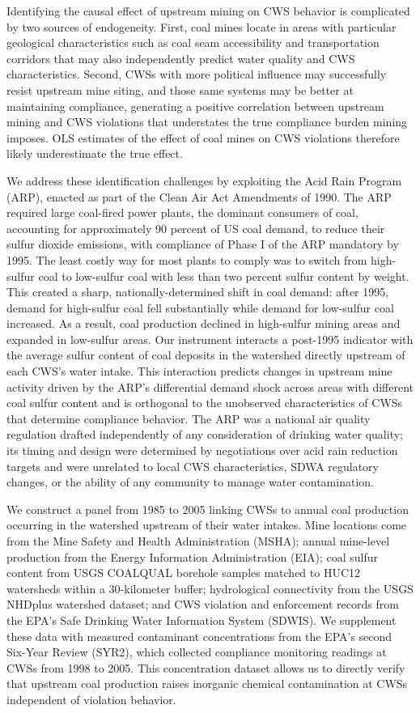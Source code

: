 \documentclass{article}
\begin{document}
Identifying the causal effect of upstream mining on CWS behavior is complicated by two sources of endogeneity. First, coal mines locate in areas with particular geological characteristics such as coal seam accessibility and transportation corridors that may also independently predict water quality and CWS characteristics. Second, CWSs with more political influence may successfully resist upstream mine siting, and those same systems may be better at maintaining compliance, generating a positive correlation between upstream mining and CWS violations that understates the true compliance burden mining imposes. OLS estimates of the effect of coal mines on CWS violations therefore likely underestimate the true effect.

We address these identification challenges by exploiting the Acid Rain Program (ARP), enacted as part of the Clean Air Act Amendments of 1990. The ARP required large coal-fired power plants, the dominant consumers of coal, accounting for approximately 90 percent of US coal demand, to reduce their sulfur dioxide emissions, with compliance of Phase I of the ARP mandatory by 1995. The least costly way for most plants to comply was to switch from high-sulfur coal to low-sulfur coal with less than two percent sulfur content by weight. This created a sharp, nationally-determined shift in coal demand: after 1995, demand for high-sulfur coal fell substantially while demand for low-sulfur coal increased. As a result, coal production declined in high-sulfur mining areas and expanded in low-sulfur areas. Our instrument interacts a post-1995 indicator with the average sulfur content of coal deposits in the watershed directly upstream of each CWS's water intake. This interaction predicts changes in upstream mine activity driven by the ARP's differential demand shock across areas with different coal sulfur content and is orthogonal to the unobserved characteristics of CWSs that determine compliance behavior. The ARP was a national air quality regulation drafted independently of any consideration of drinking water quality; its timing and design were determined by negotiations over acid rain reduction targets and were unrelated to local CWS characteristics, SDWA regulatory changes, or the ability of any community to manage water contamination.

We construct a panel from 1985 to 2005 linking CWSs to annual coal production occurring in the watershed upstream of their water intakes. Mine locations come from the Mine Safety and Health Administration (MSHA); annual mine-level production from the Energy Information Administration (EIA); coal sulfur content from USGS COALQUAL borehole samples matched to HUC12 watersheds within a 30-kilometer buffer; hydrological connectivity from the USGS NHDplus watershed dataset; and CWS violation and enforcement records from the EPA's Safe Drinking Water Information System (SDWIS). We supplement these data with measured contaminant concentrations from the EPA's second Six-Year Review (SYR2), which collected compliance monitoring readings at CWSs from 1998 to 2005. This concentration dataset allows us to directly verify that upstream coal production raises inorganic chemical contamination at CWSs independent of violation behavior.
\end{document}
